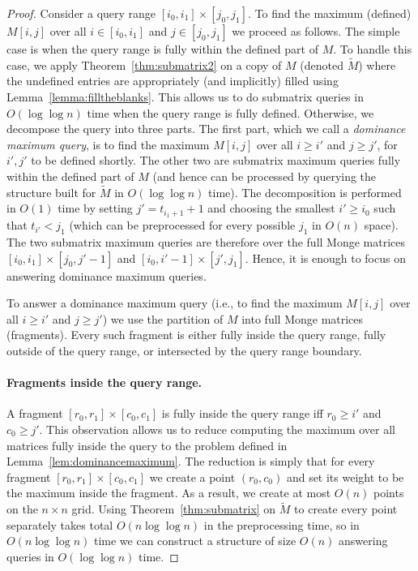 \documentclass{llncs}
\begin{document}
\begin{proof}
Consider a query range $[i_{0},i_{1}]\times  [j_{0},j_{1}]$.
To find the maximum (defined) $M[i,j]$ over all $i\in [i_{0},i_{1}]$ and $j\in [j_{0},j_{1}]$ 
we proceed as follows. The simple case is when the query range is fully within the defined part of $M$. To handle this case, we apply Theorem~\ref{thm:submatrix2} on a copy of $M$ (denoted $\widetilde M$) where the undefined entries are appropriately (and implicitly) filled using Lemma~\ref{lemma:filltheblanks}. This allows us to do submatrix queries in $O(\log\log n)$ time when the query range is fully defined.
Otherwise, we decompose the query into three parts. 
The first part, which we call a \emph{dominance maximum query}, is to
find the maximum $M[i,j]$ over all $i \geq i'$ and $j\geq j'$, for
$i',j'$ to be defined shortly.
The other two are submatrix maximum queries fully within the defined part of $M$ (and hence can be processed by querying the
structure built for $\widetilde M$ in $O(\log\log n)$ time). The decomposition is performed in $O(1)$ time by setting
$j'=t_{i_{1}+1} +1$ and choosing the smallest $i'\geq i_{0}$ such that $t_{i'} < j_{1}$ (which can be preprocessed for every possible
$j_{1}$ in $O(n)$ space). The two submatrix maximum queries are therefore over the full Monge matrices $[i_{0},i_{1}]\times [j_{0},j'-1]$ and  $[i_{0},i'-1]\times [j',j_{1}]$. Hence,
it is enough to focus on answering dominance maximum queries.

To answer a dominance maximum query (i.e., to find the maximum $M[i,j]$ over all $i \geq i'$ and $j\geq j'$) we use the partition of $M$ into full Monge matrices (fragments). Every such fragment
is either fully inside the query range, fully outside of the query range, or intersected by the query range boundary. 

\paragraph{\bf Fragments inside the query range.}
A fragment $[r_{0},r_{1}]\times [c_{0},c_{1}]$ is fully inside the query range iff
$r_{0} \geq i'$ and $c_{0} \geq j'$. This observation allows us to reduce computing the maximum
over all matrices fully inside the query to the problem defined in Lemma~\ref{lem:dominancemaximum}.
The reduction is simply that for every fragment $[r_{0},r_{1}]\times [c_{0},c_{1}]$ we create
a point $(r_{0},c_{0})$ and set its weight to be the maximum inside the fragment. As a result, we
create at most $O(n)$ points on the $n\times n$ grid. 
Using Theorem~\ref{thm:submatrix} on $\widetilde M$ to create every point separately 
takes total $O(n\log\log n)$ in the preprocessing time, so in $O(n\log\log n)$ time
we can construct a structure of size $O(n)$ answering queries in $O(\log\log n)$ time.


\end{proof}
\end{document}
